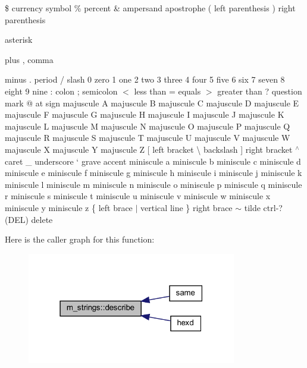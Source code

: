 \$ currency symbol \% percent \& ampersand \textquotesingle{} apostrophe ( left parenthesis ) right parenthesis
\begin{DoxyItemize}
\item asterisk
\item plus , comma
\item minus . period / slash 0 zero 1 one 2 two 3 three 4 four 5 five 6 six 7 seven 8 eight 9 nine \+: colon ; semicolon $<$ less than = equals $>$ greater than ? question mark @ at sign majuscule A majuscule B majuscule C majuscule D majuscule E majuscule F majuscule G majuscule H majuscule I majuscule J majuscule K majuscule L majuscule M majuscule N majuscule O majuscule P majuscule Q majuscule R majuscule S majuscule T majuscule U majuscule V majuscule W majuscule X majuscule Y majuscule Z \mbox{[} left bracket \textbackslash{} backslash \mbox{]} right bracket $^\wedge$ caret \+\_\+ underscore ` grave accent miniscule a miniscule b miniscule c miniscule d miniscule e miniscule f miniscule g miniscule h miniscule i miniscule j miniscule k miniscule l miniscule m miniscule n miniscule o miniscule p miniscule q miniscule r miniscule s miniscule t miniscule u miniscule v miniscule w miniscule x miniscule y miniscule z \{ left brace $\vert$ vertical line \} right brace $\sim$ tilde ctrl-\/? (D\+EL) delete 
\end{DoxyItemize}Here is the caller graph for this function\+:
\nopagebreak
\begin{figure}[H]
\begin{center}
\leavevmode
\includegraphics[width=259pt]{namespacem__strings_a8d7007f0c34d7db4c004dac56e609b3f_icgraph}
\end{center}
\end{figure}
\mbox{\label{namespacem__strings_a33b248107c1521272b55cda5c4077378}} 
